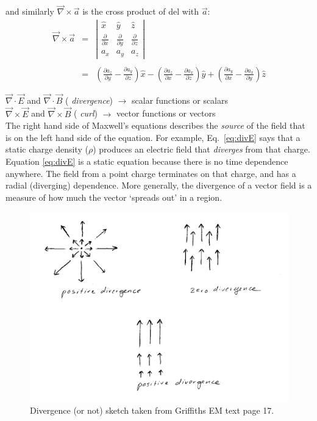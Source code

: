 \documentclass[12pt]{article}
\begin{document}
\begin{flushleft}
and similarly $\vec{\nabla} \times \vec{a}$ is the cross product of del with $\vec{a}$:
\begin{eqnarray*}
 \vec{\nabla} \times \vec{a} & = & \left| \begin{array}{ccc} 
\hat{x} & \hat{y} & \hat{z} \\ 
\frac{\partial}{\partial x} & \frac{\partial}{\partial y} & \frac{\partial}{\partial z} \\
a_{x} & a_{y} & a_{z}
\end{array} \right| \\
\\
& = & \left( \frac{\partial a_{z}}{\partial y}-\frac{\partial a_{y}}{\partial z} \right)\hat{x} - \left( \frac{\partial a_{z}}{\partial x}-\frac{\partial a_{x}}{\partial z} \right)\hat{y} + \left( \frac{\partial a_{y}}{\partial x}-\frac{\partial a_{x}}{\partial y} \right)\hat{z}
\end{eqnarray*}


$\vec{\nabla} \cdot \vec{E}$ and $\vec{\nabla} \cdot \vec{B}$ ({\it \color{myblue} divergence}) $\longrightarrow$ scalar functions or scalars\\
$\vec{\nabla} \times \vec{E}$ and $\vec{\nabla} \times \vec{B}$ ({\it \color{myblue} curl}) $\longrightarrow$ vector functions or vectors\\

\vspace{.2in}
The right hand side of Maxwell's equations describes the {\it source} of the field that is on the left hand side of the equation.  For example, Eq.~\ref{eq:divE} says that a static charge density ($\rho$) produces an electric field that {\it diverges} from that charge.  Equation \ref{eq:divE}  is a static equation because there is no time dependence anywhere.  The field from a point charge terminates on that charge, and has a radial (diverging) dependence.   More generally, the divergence of a vector field is a measure of how much the vector `spreads out' in a region.

\begin{figure}[h]
\centering
\includegraphics*[trim=0cm 0cm 0cm 0cm, clip=true, width=0.6\columnwidth]{divdraw.png}
\caption{Divergence (or not) sketch taken from Griffiths EM text page 17.}
\label{fig:divdraw}
\end{figure}


\end{flushleft}
\end{document}
